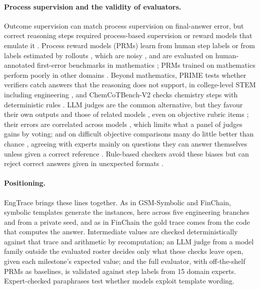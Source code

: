 \paragraph{Process supervision and the validity of evaluators.}
Outcome supervision can match process supervision on final-answer error, but correct reasoning steps required process-based supervision or reward models that emulate it \citep{uesato2022processoutcome}.
Process reward models (PRMs) learn from human step labels \citep{lightman2023verify} or from labels estimated by rollouts \citep{wang2023mathshepherd}, which are noisy \citep{zhang2025prmlessons}, and are evaluated on human-annotated first-error benchmarks in mathematics \citep{zheng2024processbench,song2025prmbench}; PRMs trained on mathematics perform poorly in other domains \citep{zeng2025versaprm}.
Beyond mathematics, PRIME tests whether verifiers catch answers that the reasoning does not support, in college-level STEM including engineering \citep{wang2026prime}, and ChemCoTBench-V2 checks chemistry steps with deterministic rules \citep{guo2026chemcotbenchv2}.
LLM judges are the common alternative, but they favour their own outputs and those of related models \citep{zheng2023mtbench,panickssery2024selfrecognition,spiliopoulou2025playfavorites,li2026preferenceleakage}, even on objective rubric items \citep{pombal2026rubricselfpreference}; their errors are correlated across models \citep{goel2025greatmodels,kim2025correlatederrors}, which limits what a panel of judges \citep{verga2024poll} gains by voting; and on difficult objective comparisons many do little better than chance \citep{tan2025judgebench}, agreeing with experts mainly on questions they can answer themselves unless given a correct reference \citep{krumdick2026nofreelabels}.
Rule-based checkers avoid these biases but can reject correct answers given in unexpected formats \citep{huang2026verifierrobustness,ansari2026physicsregrading}.

\paragraph{Positioning.}
EngTrace brings these lines together.
As in GSM-Symbolic and FinChain, symbolic templates generate the instances, here across five engineering branches and from a private seed, and as in FinChain the gold trace comes from the code that computes the answer.
Intermediate values are checked deterministically against that trace and arithmetic by recomputation; an LLM judge from a model family outside the evaluated roster decides only what these checks leave open, given each milestone's expected value; and the full evaluator, with off-the-shelf PRMs as baselines, is validated against step labels from 15 domain experts.
Expert-checked paraphrases test whether models exploit template wording.

